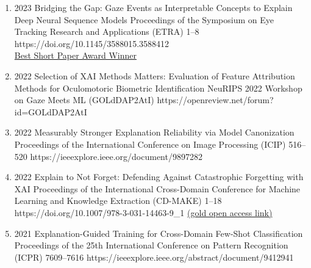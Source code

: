 {\begin{enumerate}
        \item {}
                            {2023}
                            {Bridging the Gap: Gaze Events as Interpretable Concepts to Explain Deep Neural Sequence Models}
                            {Proceedings of the Symposium on Eye Tracking Research and Applications (ETRA)}
                            {1--8}
                            {https://doi.org/10.1145/3588015.3588412} 
                            {\\\href{https://datacloud.hhi.fraunhofer.de/s/YExo6qyWDxksRof}{Best Short Paper Award Winner}}

        \item {}
                            {2022}
                            {Selection of XAI Methods Matters: Evaluation of Feature Attribution Methods for Oculomotoric Biometric Identification}
                            {NeuRIPS 2022 Workshop on Gaze Meets ML}
                            {(GOLdDAP2AtI)}
                            {https://openreview.net/forum?id=GOLdDAP2AtI} 


        \item {}
                            {2022}
                            {Measurably Stronger Explanation Reliability via Model Canonization}
                            {Proceedings of the International Conference on Image Processing (ICIP)}
                            {516--520}
                            {https://ieeexplore.ieee.org/document/9897282}

        \item {}
                            {2022}
                            {Explain to Not Forget: Defending Against Catastrophic Forgetting with XAI}
                            {Proceedings of the International Cross-Domain Conference for Machine Learning and Knowledge Extraction (CD-MAKE)}
                            {1--18}
                            {https://doi.org/10.1007/978-3-031-14463-9_1}
                            {\href{https://link.springer.com/content/pdf/10.1007/978-3-031-04083-2.pdf}{(gold open access link)}} %

        \item {}
                                {2021}
                                {Explanation-Guided Training for Cross-Domain Few-Shot Classification}
                                {Proceedings of the 25th International Conference on Pattern Recognition (ICPR)}
                                {7609--7616}
                                {https://ieeexplore.ieee.org/abstract/document/9412941}


\end{enumerate}}
